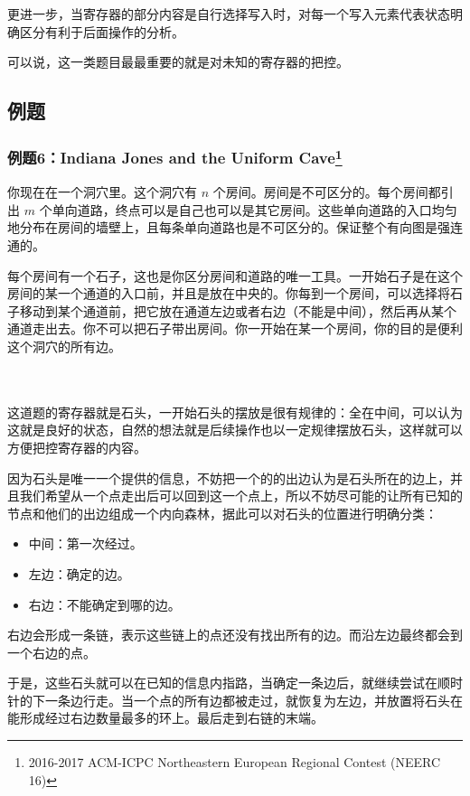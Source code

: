 \documentclass{noithesis}
\begin{document}
更进一步，当寄存器的部分内容是自行选择写入时，对每一个写入元素代表状态明确区分有利于后面操作的分析。

可以说，这一类题目最最重要的就是对未知的寄存器的把控。

\subsection{例题}

\subsubsection{例题6：Indiana Jones and the Uniform Cave\footnote{2016-2017 ACM-ICPC Northeastern European Regional Contest (NEERC 16)}}

你现在在一个洞穴里。这个洞穴有 $n$ 个房间。房间是不可区分的。每个房间都引出 $m$ 个单向道路，终点可以是自己也可以是其它房间。这些单向道路的入口均匀地分布在房间的墙壁上，且每条单向道路也是不可区分的。保证整个有向图是强连通的。

每个房间有一个石子，这也是你区分房间和道路的唯一工具。一开始石子是在这个房间的某一个通道的入口前，并且是放在中央的。你每到一个房间，可以选择将石子移动到某个通道前，把它放在通道左边或者右边（不能是中间），然后再从某个通道走出去。你不可以把石子带出房间。你一开始在某一个房间，你的目的是便利这个洞穴的所有边。

\paragraph{}\

这道题的寄存器就是石头，一开始石头的摆放是很有规律的：全在中间，可以认为这就是良好的状态，自然的想法就是后续操作也以一定规律摆放石头，这样就可以方便把控寄存器的内容。

因为石头是唯一一个提供的信息，不妨把一个的的出边认为是石头所在的边上，并且我们希望从一个点走出后可以回到这一个点上，所以不妨尽可能的让所有已知的节点和他们的出边组成一个内向森林，据此可以对石头的位置进行明确分类：

\begin{itemize}
	\item 中间：第一次经过。
	\item 左边：确定的边。
	\item 右边：不能确定到哪的边。
\end{itemize}

右边会形成一条链，表示这些链上的点还没有找出所有的边。而沿左边最终都会到一个右边的点。

于是，这些石头就可以在已知的信息内指路，当确定一条边后，就继续尝试在顺时针的下一条边行走。当一个点的所有边都被走过，就恢复为左边，并放置将石头在能形成经过右边数量最多的环上。最后走到右链的末端。
\end{document}
